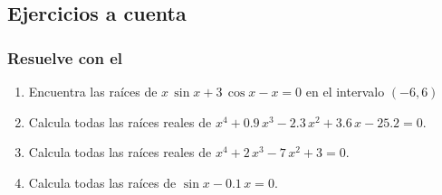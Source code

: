 \documentclass[12pt]{beamer}
\begin{document}



\subsection{Ejercicios a cuenta}

\begin{frame}
\frametitle{Resuelve con el }
\begin{enumerate}[<+->]
\item Encuentra las raíces de $x \, \sin x + 3 \, \cos x - x = 0$ en el intervalo $(-6, 6)$ \\
\item Calcula todas las raíces reales de $x^{4} + 0.9 \, x^{3} - 2.3 \, x^{2} + 3.6 \, x - 25.2 = 0$. \\
\item Calcula todas las raíces reales de $x^{4} + 2 \, x^{3} - 7 \, x^{2} + 3 = 0$. \\
\item Calcula todas las raíces de $\sin x - 0.1 \, x = 0$.
\end{enumerate}
\end{frame}
\end{document}
